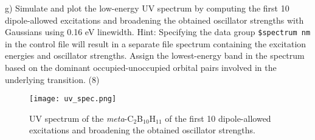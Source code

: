 \documentclass{article}
\begin{document}
\noindent g) Simulate and plot the low-energy UV spectrum by computing the
first 10 dipole-allowed excitations and broadening the obtained oscillator
strengths with Gaussians using 0.16 eV linewidth. Hint: Specifying the data
group \texttt{\$spectrum nm} in the control file will result in a separate file spectrum
containing the excitation energies and oscillator strengths. Assign the
lowest-energy band in the spectrum based on the dominant occupied-unoccupied
orbital pairs involved in the underlying transition. (8)

\begin{figure}[H]
  \centering
  \texttt{[image: uv\_spec.png]}
  \caption{UV spectrum of the \textit{meta}-C$_2$B$_{10}$H$_{11}$ of the
    first 10 dipole-allowed excitations and broadening the obtained oscillator
    strengths.}
  \label{fig:spec}
\end{figure}
\end{document}

